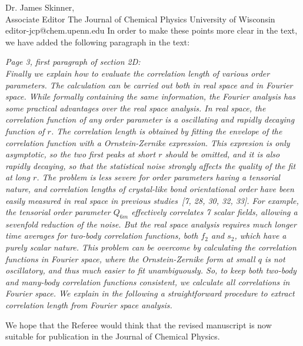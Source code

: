\documentclass[a4paper, rebuttal, parskip=true, firsthead=false, fromemail=false, foldmarks=false]{scrlttr2}
\begin{document}
\begin{letter}{Dr. James Skinner,\\Associate Editor
The Journal of Chemical Physics
University of Wisconsin\\
editor-jcp@chem.upenn.edu }
In order to make these points more clear in the text, we have added the following paragraph in the text:

{\it Page 3, first paragraph of section 2D:\\
Finally we explain how to evaluate the correlation length of various order parameters. The calculation can be carried out both
in real space and in Fourier space. While formally containing the same information, the Fourier analysis has some practical advantages over
the real space analysis.
In real space, the correlation function of any order parameter is a oscillating and rapidly decaying function of $r$. The
correlation length is obtained by fitting the \emph{envelope} of the correlation function with a Ornstein-Zernike expression.
This expresion is only asymptotic, so the two first peaks at short $r$ should be omitted, and it is also rapidly decaying, so that
the statistical noise strongly affects the quality of the fit at long $r$. The problem is less severe for order parameters
having a tensorial nature, and correlation lengths of crystal-like bond orientational order have been easily measured in real space in previous studies~[7, 28, 30, 32, 33].
For example, the tensorial order parameter $Q_{6m}$ effectively
correlates 7 scalar fields, allowing a sevenfold reduction of the noise. But the real space analysis requires much longer
time averages for two-body correlation functions, both $f_2$ and $s_2$, which have a purely scalar nature.
This problem can be overcome by calculating the correlation functions in Fourier space, where the Ornstein-Zernike form at small $q$ is not oscillatory,
and thus much easier to fit unambiguously.
So, to keep both two-body and many-body
correlation functions consistent, we calculate all correlations in Fourier space.
We explain in the following a straightforward procedure to extract correlation length from Fourier space analysis.
}



We hope that the Referee would think that the revised manuscript is now suitable for publication in the Journal of Chemical Physics.



\end{letter} 
\end{document}
